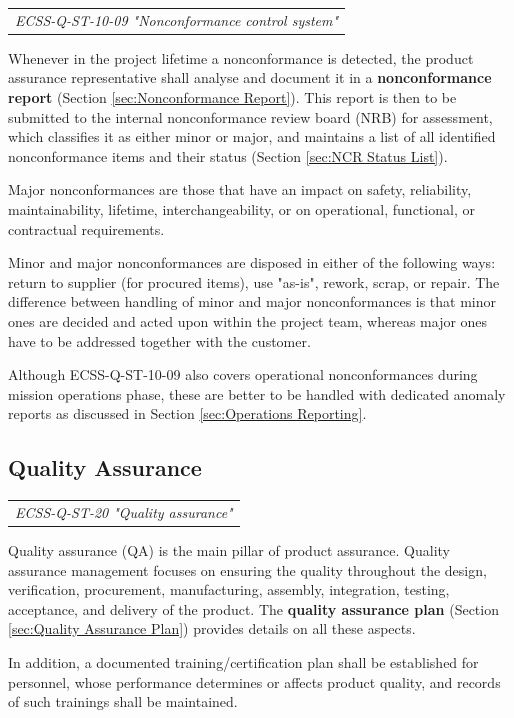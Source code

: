\begin{tabular}{l}
\textit{ECSS-Q-ST-10-09 "Nonconformance control system" \cite{ECSS-Q-ST-10-09}}
\end{tabular}

Whenever in the project lifetime a nonconformance is detected, the product assurance representative shall analyse and document it in a \textbf{nonconformance report} (Section \ref{sec:Nonconformance Report}). This report is then to be submitted to the internal nonconformance review board (NRB) for assessment, which classifies it as either minor or major, and maintains a list of all identified nonconformance items and their status (Section \ref{sec:NCR Status List}).

Major nonconformances are those that have an impact on safety, reliability, maintainability, lifetime, interchangeability, or on operational, functional, or contractual requirements.

Minor and major nonconformances are disposed in either of the following ways: return to supplier (for procured items), use "as-is", rework, scrap, or repair. The difference between handling of minor and major nonconformances is that minor ones are decided and acted upon within the project team, whereas major ones have to be addressed together with the customer.
 
Although ECSS-Q-ST-10-09 also covers operational nonconformances during mission operations phase, these are better to be handled with dedicated anomaly reports as discussed in Section \ref{sec:Operations Reporting}.

\subsection{Quality Assurance}

\begin{tabular}{l}
\textit{ECSS-Q-ST-20 "Quality assurance" \cite{ECSS-Q-ST-20}}
\end{tabular}

Quality assurance (QA) is the main pillar of product assurance. Quality assurance management focuses on ensuring the quality throughout the design, verification, procurement, manufacturing, assembly, integration, testing, acceptance, and delivery of the product. The \textbf{quality assurance plan} (Section \ref{sec:Quality Assurance Plan}) provides details on all these aspects. 

In addition, a documented training/certification plan shall be established for personnel, whose performance determines or affects product quality, and records of such trainings shall be maintained.

